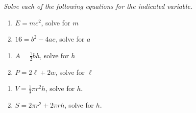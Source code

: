 \documentclass[11pt]{article}
\begin{document}
\noindent
\textit{Solve each of the following equations for the indicated variable.}
\begin{multicols}{2}
\begin{enumerate}
\setcounter{enumi}{\theenumCount}
\item $E = mc^2$, solve for $m$ 
\item $16 = b^2 - 4ac$, solve for $a$
\setcounter{enumCount}{\theenumi}
\end{enumerate}
\end{multicols}
\vfill

\begin{multicols}{2}
\begin{enumerate}
\setcounter{enumi}{\theenumCount}
\item $A = \tfrac{1}{2} bh$, solve for $h$
\item $P = 2\ell + 2w$, solve for $\ell$
\setcounter{enumCount}{\theenumi}
\end{enumerate}
\end{multicols}
\vfill

\begin{multicols}{2}
\begin{enumerate}
\setcounter{enumi}{\theenumCount}
\item $V = \tfrac{1}{3} \pi r^2 h$, solve for $h$.
\item $S = 2\pi r^2 + 2 \pi r h$, solve for $h$. 
\setcounter{enumCount}{\theenumi}
\end{enumerate}
\end{multicols}
\vfill


%

\vfill
\end{document}
